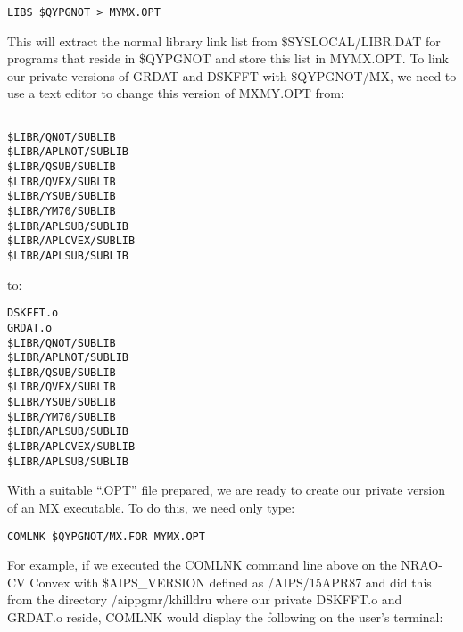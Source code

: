 \begin{verbatim}
LIBS $QYPGNOT > MYMX.OPT

\end{verbatim}
This will extract the normal library link list from
\$SYSLOCAL/LIBR.DAT for programs that reside in \$QYPGNOT and store
this list in MYMX.OPT. To link our private versions of GRDAT and
DSKFFT with \$QYPGNOT/MX, we need to use a text editor to change this
version of MXMY.OPT from:
\begin{verbatim}

$LIBR/QNOT/SUBLIB
$LIBR/APLNOT/SUBLIB
$LIBR/QSUB/SUBLIB
$LIBR/QVEX/SUBLIB
$LIBR/YSUB/SUBLIB
$LIBR/YM70/SUBLIB
$LIBR/APLSUB/SUBLIB
$LIBR/APLCVEX/SUBLIB
$LIBR/APLSUB/SUBLIB

\end{verbatim}
to:

\begin{verbatim}
DSKFFT.o
GRDAT.o
$LIBR/QNOT/SUBLIB
$LIBR/APLNOT/SUBLIB
$LIBR/QSUB/SUBLIB
$LIBR/QVEX/SUBLIB
$LIBR/YSUB/SUBLIB
$LIBR/YM70/SUBLIB
$LIBR/APLSUB/SUBLIB
$LIBR/APLCVEX/SUBLIB
$LIBR/APLSUB/SUBLIB

\end{verbatim}
With a suitable ``.OPT'' file prepared, we are ready to create our
private version of an MX executable.  To do this, we need only type:

\begin{verbatim}
COMLNK $QYPGNOT/MX.FOR MYMX.OPT

\end{verbatim}
For example, if we executed the COMLNK command line above on the
NRAO-CV Convex with \$AIPS\_VERSION defined as /AIPS/15APR87 and did
this from the directory /aippgmr/khilldru where our private DSKFFT.o
and GRDAT.o reside, COMLNK would display the following on the user's
terminal:

